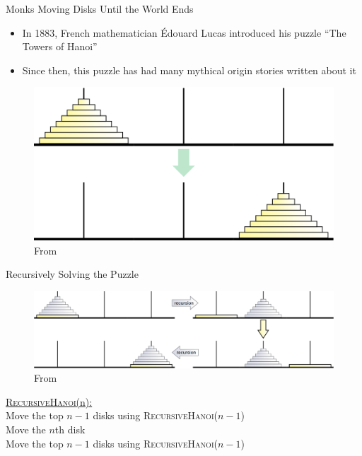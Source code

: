 \documentclass[aspectratio=169]{beamer}
\begin{document}
\begin{frame}{Monks Moving Disks Until the World Ends}
    \begin{itemize}
        \item In 1883, French mathematician \'Edouard Lucas introduced his puzzle ``The Towers of Hanoi'' \pause
        \item Since then, this puzzle has had many mythical origin stories written about it
    \end{itemize}
    \begin{figure}
        \centering
        \includegraphics[scale=0.225]{images/hanoi.png}
        \caption{From \cite{book:algorithms}}
    \end{figure}
\end{frame}

\begin{frame}{Recursively Solving the Puzzle}
    \begin{figure}
        \centering
        \includegraphics[scale=0.25]{images/recursive_hanoi.png}
        \caption{From \cite{book:algorithms}}
    \end{figure} \pause
    
    \begin{nalgo}
                \underline{\textsc{RecursiveHanoi}(n):}\+
    \\\label{}      Move the top $n - 1$ disks using \textsc{RecursiveHanoi}($n - 1$)
    \\\label{}      Move the $n$th disk
    \\\label{}      Move the top $n - 1$ disks using \textsc{RecursiveHanoi}($n - 1$)
    \end{nalgo}
\end{frame}
\end{document}
